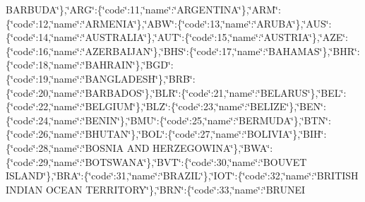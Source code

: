 \begin{DoxyCompactItemize}
B\-A\-R\-B\-U\-D\-A\char`\"{}\},\char`\"{}A\-R\-G\char`\"{}\-:\{\char`\"{}code\char`\"{}\-:11,\char`\"{}name\char`\"{}\-:\char`\"{}A\-R\-G\-E\-N\-T\-I\-N\-A\char`\"{}\},\char`\"{}A\-R\-M\char`\"{}\-:\{\char`\"{}code\char`\"{}\-:12,\char`\"{}name\char`\"{}\-:\char`\"{}A\-R\-M\-E\-N\-I\-A\char`\"{}\},\char`\"{}A\-B\-W\char`\"{}\-:\{\char`\"{}code\char`\"{}\-:13,\char`\"{}name\char`\"{}\-:\char`\"{}A\-R\-U\-B\-A\char`\"{}\},\char`\"{}A\-U\-S\char`\"{}\-:\{\char`\"{}code\char`\"{}\-:14,\char`\"{}name\char`\"{}\-:\char`\"{}A\-U\-S\-T\-R\-A\-L\-I\-A\char`\"{}\},\char`\"{}A\-U\-T\char`\"{}\-:\{\char`\"{}code\char`\"{}\-:15,\char`\"{}name\char`\"{}\-:\char`\"{}A\-U\-S\-T\-R\-I\-A\char`\"{}\},\char`\"{}A\-Z\-E\char`\"{}\-:\{\char`\"{}code\char`\"{}\-:16,\char`\"{}name\char`\"{}\-:\char`\"{}A\-Z\-E\-R\-B\-A\-I\-J\-A\-N\char`\"{}\},\char`\"{}B\-H\-S\char`\"{}\-:\{\char`\"{}code\char`\"{}\-:17,\char`\"{}name\char`\"{}\-:\char`\"{}B\-A\-H\-A\-M\-A\-S\char`\"{}\},\char`\"{}B\-H\-R\char`\"{}\-:\{\char`\"{}code\char`\"{}\-:18,\char`\"{}name\char`\"{}\-:\char`\"{}B\-A\-H\-R\-A\-I\-N\char`\"{}\},\char`\"{}B\-G\-D\char`\"{}\-:\{\char`\"{}code\char`\"{}\-:19,\char`\"{}name\char`\"{}\-:\char`\"{}B\-A\-N\-G\-L\-A\-D\-E\-S\-H\char`\"{}\},\char`\"{}B\-R\-B\char`\"{}\-:\{\char`\"{}code\char`\"{}\-:20,\char`\"{}name\char`\"{}\-:\char`\"{}B\-A\-R\-B\-A\-D\-O\-S\char`\"{}\},\char`\"{}B\-L\-R\char`\"{}\-:\{\char`\"{}code\char`\"{}\-:21,\char`\"{}name\char`\"{}\-:\char`\"{}B\-E\-L\-A\-R\-U\-S\char`\"{}\},\char`\"{}B\-E\-L\char`\"{}\-:\{\char`\"{}code\char`\"{}\-:22,\char`\"{}name\char`\"{}\-:\char`\"{}B\-E\-L\-G\-I\-U\-M\char`\"{}\},\char`\"{}B\-L\-Z\char`\"{}\-:\{\char`\"{}code\char`\"{}\-:23,\char`\"{}name\char`\"{}\-:\char`\"{}B\-E\-L\-I\-Z\-E\char`\"{}\},\char`\"{}B\-E\-N\char`\"{}\-:\{\char`\"{}code\char`\"{}\-:24,\char`\"{}name\char`\"{}\-:\char`\"{}B\-E\-N\-I\-N\char`\"{}\},\char`\"{}B\-M\-U\char`\"{}\-:\{\char`\"{}code\char`\"{}\-:25,\char`\"{}name\char`\"{}\-:\char`\"{}B\-E\-R\-M\-U\-D\-A\char`\"{}\},\char`\"{}B\-T\-N\char`\"{}\-:\{\char`\"{}code\char`\"{}\-:26,\char`\"{}name\char`\"{}\-:\char`\"{}B\-H\-U\-T\-A\-N\char`\"{}\},\char`\"{}B\-O\-L\char`\"{}\-:\{\char`\"{}code\char`\"{}\-:27,\char`\"{}name\char`\"{}\-:\char`\"{}B\-O\-L\-I\-V\-I\-A\char`\"{}\},\char`\"{}B\-I\-H\char`\"{}\-:\{\char`\"{}code\char`\"{}\-:28,\char`\"{}name\char`\"{}\-:\char`\"{}B\-O\-S\-N\-I\-A A\-N\-D H\-E\-R\-Z\-E\-G\-O\-W\-I\-N\-A\char`\"{}\},\char`\"{}B\-W\-A\char`\"{}\-:\{\char`\"{}code\char`\"{}\-:29,\char`\"{}name\char`\"{}\-:\char`\"{}B\-O\-T\-S\-W\-A\-N\-A\char`\"{}\},\char`\"{}B\-V\-T\char`\"{}\-:\{\char`\"{}code\char`\"{}\-:30,\char`\"{}name\char`\"{}\-:\char`\"{}B\-O\-U\-V\-E\-T I\-S\-L\-A\-N\-D\char`\"{}\},\char`\"{}B\-R\-A\char`\"{}\-:\{\char`\"{}code\char`\"{}\-:31,\char`\"{}name\char`\"{}\-:\char`\"{}B\-R\-A\-Z\-I\-L\char`\"{}\},\char`\"{}I\-O\-T\char`\"{}\-:\{\char`\"{}code\char`\"{}\-:32,\char`\"{}name\char`\"{}\-:\char`\"{}B\-R\-I\-T\-I\-S\-H I\-N\-D\-I\-A\-N O\-C\-E\-A\-N T\-E\-R\-R\-I\-T\-O\-R\-Y\char`\"{}\},\char`\"{}B\-R\-N\char`\"{}\-:\{\char`\"{}code\char`\"{}\-:33,\char`\"{}name\char`\"{}\-:\char`\"{}B\-R\-U\-N\-E\-I 
\end{DoxyCompactItemize}

